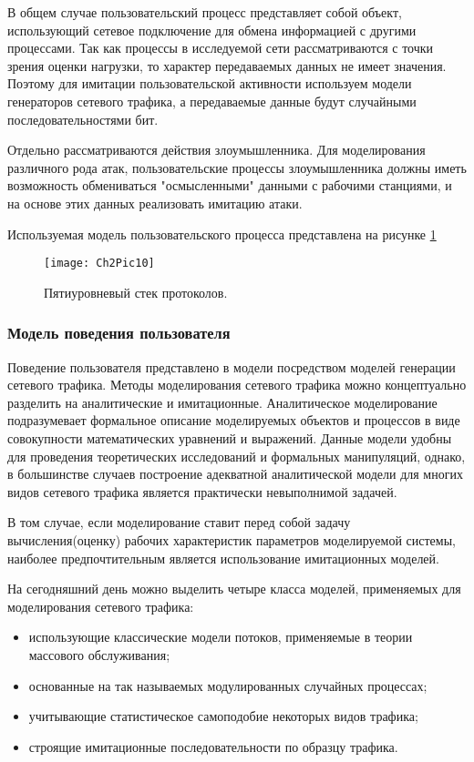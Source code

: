     В общем случае пользовательский процесс представляет собой объект, использующий сетевое подключение для обмена информацией с другими процессами. Так как процессы в исследуемой сети рассматриваются с точки зрения оценки нагрузки, то характер передаваемых данных не имеет значения. Поэтому для имитации пользовательской активности используем модели генераторов сетевого трафика, а передаваемые данные будут случайными последовательностями бит.

    Отдельно рассматриваются действия злоумышленника. Для моделирования различного рода атак, пользовательские процессы злоумышленника должны иметь возможность обмениваться "осмысленными" данными с рабочими станциями, и на основе этих данных реализовать имитацию атаки.

    Используемая модель пользовательского процесса представлена на рисунке \ref{Pic10}

    \begin{figure}\center
        \texttt{[image: Ch2Pic10]}
        \caption{Пятиуровневый стек протоколов.} \label{Pic10}
    \end{figure}

    \subsubsection{Модель поведения пользователя}

    Поведение пользователя представлено в модели посредством моделей генерации сетевого трафика. Методы моделирования сетевого трафика можно концептуально разделить на аналитические и имитационные. Аналитическое моделирование подразумевает формальное описание моделируемых объектов и процессов в виде совокупности математических уравнений и выражений. Данные модели удобны для проведения теоретических исследований и формальных манипуляций, однако, в большинстве случаев построение адекватной аналитической модели для многих видов сетевого трафика является практически невыполнимой задачей.

    В том случае, если моделирование ставит перед собой задачу вычисления(оценку) рабочих характеристик параметров моделируемой системы, наиболее предпочтительным является использование имитационных моделей.

    На сегодняшний день можно выделить четыре класса моделей, применяемых для моделирования сетевого трафика:
    \begin{itemize}
        \item использующие классические модели потоков, применяемые в теории массового обслуживания;
        \item основанные на так называемых модулированных случайных процессах;
        \item учитывающие статистическое самоподобие некоторых видов трафика;
        \item строящие имитационные последовательности по образцу трафика.
    \end{itemize}

